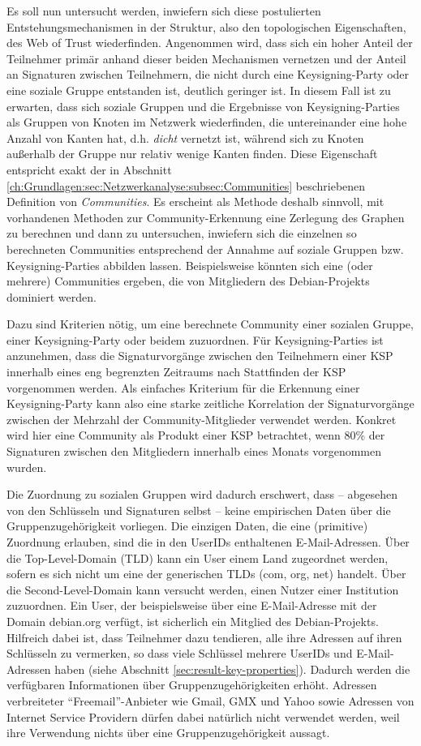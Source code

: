 Es soll nun untersucht werden, inwiefern sich diese postulierten
Entstehungsmechanismen in der Struktur, also den topologischen
Eigenschaften, des Web of Trust wiederfinden. Angenommen wird, dass
sich ein hoher Anteil der Teilnehmer primär anhand dieser beiden
Mechanismen vernetzen und der Anteil an Signaturen zwischen
Teilnehmern, die nicht durch eine Keysigning-Party oder eine soziale
Gruppe entstanden ist, deutlich geringer ist. In diesem Fall ist zu
erwarten, dass sich soziale Gruppen und die Ergebnisse von
Keysigning-Parties als Gruppen von Knoten im Netzwerk wiederfinden,
die untereinander eine hohe Anzahl von Kanten hat, d.h. \emph{dicht}
vernetzt ist, während sich zu Knoten außerhalb der Gruppe nur
relativ wenige Kanten finden. Diese Eigenschaft entspricht exakt der
in Abschnitt
\ref{ch:Grundlagen:sec:Netzwerkanalyse:subsec:Communities}
beschriebenen Definition von \emph{Communities}. Es erscheint als
Methode deshalb sinnvoll, mit vorhandenen Methoden zur
Community-Erkennung eine Zerlegung des Graphen zu berechnen und dann
zu untersuchen, inwiefern sich die einzelnen so berechneten
Communities entsprechend der Annahme auf soziale Gruppen
bzw. Keysigning-Parties abbilden lassen. Beispielsweise könnten sich
eine (oder mehrere) Communities ergeben, die von Mitgliedern des
Debian-Projekts dominiert werden.

Dazu sind Kriterien nötig, um eine berechnete Community einer
sozialen Gruppe, einer Keysigning-Party oder beidem zuzuordnen. Für
Keysigning-Parties ist anzunehmen, dass die Signaturvorgänge
zwischen den Teilnehmern einer KSP innerhalb eines eng begrenzten
Zeitraums nach Stattfinden der KSP vorgenommen werden. Als einfaches
Kriterium für die Erkennung einer Keysigning-Party kann also eine
starke zeitliche Korrelation der Signaturvorgänge zwischen der
Mehrzahl der Community-Mitglieder verwendet werden. Konkret wird hier
eine Community als Produkt einer KSP betrachtet, wenn 80\% der
Signaturen zwischen den Mitgliedern innerhalb eines Monats vorgenommen
wurden.

Die Zuordnung zu sozialen Gruppen wird dadurch erschwert, dass --
abgesehen von den Schlüsseln und Signaturen selbst -- keine
empirischen Daten über die Gruppenzugehörigkeit vorliegen. Die
einzigen Daten, die eine (primitive) Zuordnung erlauben, sind die in
den UserIDs enthaltenen E-Mail-Adressen. Über die Top-Level-Domain
(TLD) kann ein User einem Land zugeordnet werden, sofern es sich nicht
um eine der generischen TLDs (com, org, net) handelt. Über die
Second-Level-Domain kann versucht werden, einen Nutzer einer
Institution zuzuordnen. Ein User, der beispielsweise über eine
E-Mail-Adresse mit der Domain debian.org verfügt, ist sicherlich ein
Mitglied des Debian-Projekts. Hilfreich dabei ist, dass Teilnehmer
dazu tendieren, alle ihre Adressen auf ihren Schlüsseln zu
vermerken, so dass viele Schlüssel mehrere UserIDs und
E-Mail-Adressen haben (siehe Abschnitt
\ref{sec:result-key-properties}). Dadurch werden die verfügbaren
Informationen über Gruppenzugehörigkeiten erhöht. Adressen
verbreiteter ``Freemail''-Anbieter wie Gmail, GMX und Yahoo sowie
Adressen von Internet Service Providern dürfen dabei natürlich
nicht verwendet werden, weil ihre Verwendung nichts über eine
Gruppenzugehörigkeit aussagt.

